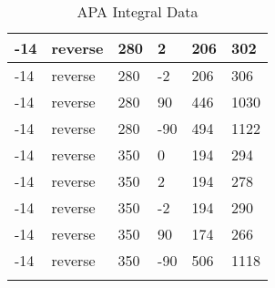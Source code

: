 \begin{longtable}{|l|l|l|l|l|l|}
			\hline
			-14 & reverse & 280 & 2 & 206 & 302 \\
			\hline
			-14 & reverse & 280 & -2 & 206 & 306 \\
			\hline
			-14 & reverse & 280 & 90 & 446 & 1030 \\
			\hline
			-14 & reverse & 280 & -90 & 494 & 1122 \\
			\hline
			-14 & reverse & 350 & 0 & 194 & 294 \\
			\hline
			-14 & reverse & 350 & 2 & 194 & 278 \\
			\hline
			-14 & reverse & 350 & -2 & 194 & 290 \\
			\hline
			-14 & reverse & 350 & 90 & 174 & 266 \\
			\hline
			-14 & reverse & 350 & -90 & 506 & 1118 \\
			\hline
	\caption{APA Integral Data}
	\label{tab:apa_sum}
\end{longtable}